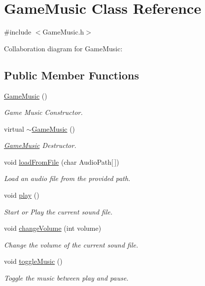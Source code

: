 \hypertarget{class_game_music}{}\section{Game\+Music Class Reference}
\label{class_game_music}


{\ttfamily \#include $<$Game\+Music.\+h$>$}



Collaboration diagram for Game\+Music\+:
\subsection*{Public Member Functions}
\begin{DoxyCompactItemize}
\item 
\hyperlink{class_game_music_a3636a483e9a9d86ff5700f4a13662dcb}{Game\+Music} ()
\begin{DoxyCompactList}\small\item\em Game Music Constructor. \end{DoxyCompactList}\item 
virtual \hyperlink{class_game_music_a3ab16e5c895c854c7c1642e5718508f2}{$\sim$\+Game\+Music} ()
\begin{DoxyCompactList}\small\item\em \hyperlink{class_game_music}{Game\+Music} Destructor. \end{DoxyCompactList}\item 
void \hyperlink{class_game_music_a47a770430dc1213a4b31ab0353549018}{load\+From\+File} (char Audio\+Path\mbox{[}$\,$\mbox{]})
\begin{DoxyCompactList}\small\item\em Load an audio file from the provided path. \end{DoxyCompactList}\item 
void \hyperlink{class_game_music_a88151bbcf754b0dc87e75cf5949b7602}{play} ()
\begin{DoxyCompactList}\small\item\em Start or Play the current sound file. \end{DoxyCompactList}\item 
void \hyperlink{class_game_music_adafedd8d8c1b98efbac108c8f8b826ac}{change\+Volume} (int volume)
\begin{DoxyCompactList}\small\item\em Change the volume of the current sound file. \end{DoxyCompactList}\item 
void \hyperlink{class_game_music_ac14197e5734c1934ca85666c14a7a1c3}{toggle\+Music} ()
\begin{DoxyCompactList}\small\item\em Toggle the music between play and pause. \end{DoxyCompactList}\end{DoxyCompactItemize}
